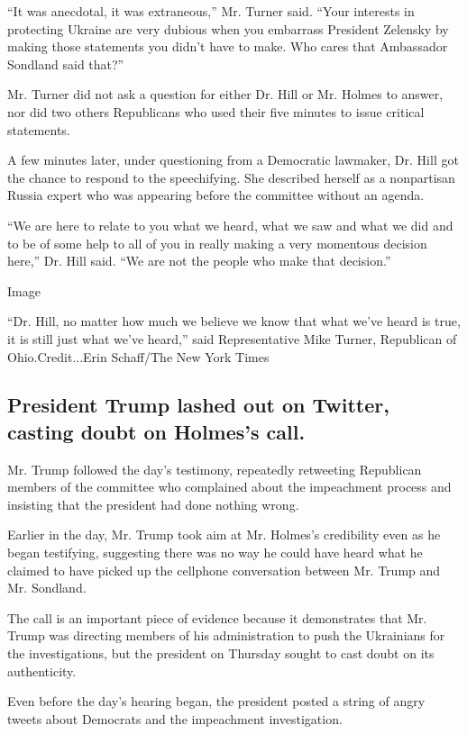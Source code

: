 ``It was anecdotal, it was extraneous,'' Mr. Turner said. ``Your
interests in protecting Ukraine are very dubious when you embarrass
President Zelensky by making those statements you didn't have to make.
Who cares that Ambassador Sondland said that?''

Mr. Turner did not ask a question for either Dr. Hill or Mr. Holmes to
answer, nor did two others Republicans who used their five minutes to
issue critical statements.

A few minutes later, under questioning from a Democratic lawmaker, Dr.
Hill got the chance to respond to the speechifying. She described
herself as a nonpartisan Russia expert who was appearing before the
committee without an agenda.

``We are here to relate to you what we heard, what we saw and what we
did and to be of some help to all of you in really making a very
momentous decision here,'' Dr. Hill said. ``We are not the people who
make that decision.''

Image

``Dr. Hill, no matter how much we believe we know that what we've heard
is true, it is still just what we've heard,'' said Representative Mike
Turner, Republican of Ohio.Credit...Erin Schaff/The New York Times

\hypertarget{president-trump-lashed-out-on-twitter-casting-doubt-on-holmess-call}{%
\subsection{President Trump lashed out on Twitter, casting doubt on
Holmes's
call.}\label{president-trump-lashed-out-on-twitter-casting-doubt-on-holmess-call}}

Mr. Trump followed the day's testimony, repeatedly retweeting Republican
members of the committee who complained about the impeachment process
and insisting that the president had done nothing wrong.

Earlier in the day, Mr. Trump took aim at Mr. Holmes's credibility even
as he began testifying, suggesting there was no way he could have heard
what he claimed to have picked up the cellphone conversation between Mr.
Trump and Mr. Sondland.

The call is an important piece of evidence because it demonstrates that
Mr. Trump was directing members of his administration to push the
Ukrainians for the investigations, but the president on Thursday sought
to cast doubt on its authenticity.

Even before the day's hearing began, the president posted a string of
angry tweets about Democrats and the impeachment investigation.

